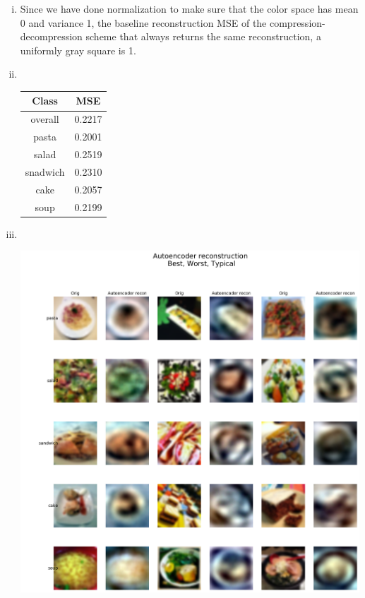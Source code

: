 \documentclass[11pt, answers]{exam}
\begin{document}
\begin{solution}
\begin{parts}
    \begin{enumerate}[i.]
      \item Since we have done normalization to make sure that the color space has mean 0 and variance 1, the baseline reconstruction MSE of the compression-decompression scheme that always returns the same reconstruction, a uniformly gray square is 1.

      \item ~\\
      \begin{tabular}{c|c}
        \hline
        Class& MSE\\
        \hline
        overall& 0.2217\\
        pasta& 0.2001\\
        salad& 0.2519\\
        snadwich& 0.2310\\
        cake& 0.2057\\
        soup& 0.2199\\
        \hline
      \end{tabular}

      \item ~\\
      \begin{center}
      \includegraphics[scale=0.35]{ae_per_class_perf.png}
      \end{center}


\end{enumerate}
\end{parts}
\end{solution}
\end{document}

